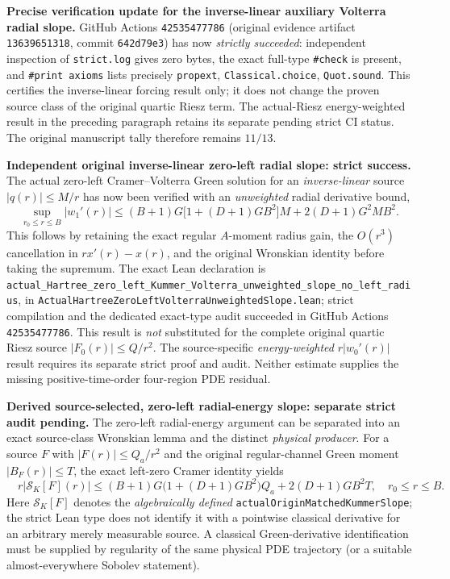 \documentclass[11pt]{amsart}
\begin{document}
\medskip
\noindent\textbf{Precise verification update for the inverse-linear
auxiliary Volterra radial slope.}
GitHub Actions \texttt{42535477786} (original evidence artifact
\texttt{13639651318}, commit \texttt{642d79e3}) has now
\emph{strictly succeeded}: independent inspection of
\texttt{strict.log} gives zero bytes, the exact full-type
\texttt{\#check} is present, and \texttt{\#print axioms}
lists precisely \texttt{propext},
\texttt{Classical.choice}, \texttt{Quot.sound}.
This certifies the inverse-linear forcing result only;
it does not change the proven source class of the original quartic
Riesz term. The actual-Riesz energy-weighted result in the preceding
paragraph retains its separate pending strict CI status.
The original manuscript tally therefore remains $11/13$.


\medskip
\noindent\textbf{Independent original inverse-linear zero-left radial slope: strict success.}
The actual zero-left Cramer--Volterra Green solution for an
\emph{inverse-linear} source $|q(r)|\le M/r$ has now been verified
with an \emph{unweighted} radial derivative bound,
\[
  \boxed{\quad
  \sup_{r_0\le r\le B}|w_1'(r)|
  \le (B+1)G\bigl[1+(D+1)GB^2\bigr]M
     +2(D+1)G^2MB^2 .\quad}
\]
This follows by retaining the exact regular $A$-moment radius gain,
the $O(r^3)$ cancellation in $r x'(r)-x(r)$, and the original
Wronskian identity before taking the supremum.
The exact Lean declaration is
\texttt{actual\_Hartree\_zero\_left\_Kummer\_Volterra\_unweighted\_slope\_no\_left\_radius},
in \texttt{ActualHartreeZeroLeftVolterraUnweightedSlope.lean};
strict compilation and the dedicated exact-type audit succeeded in
GitHub Actions \texttt{42535477786}. This result is \emph{not}
substituted for the complete original quartic Riesz source
$|F_0(r)|\le Q/r^2$.
The source-specific \emph{energy-weighted} $r|w_0'(r)|$ result
requires its separate strict proof and audit. Neither estimate supplies
the missing positive-time-order four-region PDE residual.



\medskip
\noindent\textbf{Derived source-selected, zero-left radial-energy slope:
separate strict audit pending.}
The zero-left radial-energy argument can be separated into an exact
source-class Wronskian lemma and the distinct \emph{physical producer}.
For a source $F$ with $|F(r)|\le Q_a/r^2$ and the original
regular-channel Green moment
$|B_F(r)|\le T$, the exact left-zero Cramer identity yields
\[
  \boxed{\quad r|\mathcal S_K[F](r)|
     \le (B+1)G\bigl(1+(D+1)GB^2\bigr)Q_a
            +2(D+1)GB^2 T,\quad r_0\le r\le B. \quad}
\]
Here $\mathcal S_K[F]$ denotes the \emph{algebraically defined}
\texttt{actualOriginMatchedKummerSlope}; the strict Lean type
does not identify it with a pointwise classical derivative for an
arbitrary merely measurable source. A classical Green-derivative
identification must be supplied by regularity of the same physical
PDE trajectory (or a suitable almost-everywhere Sobolev statement).
\end{document}
